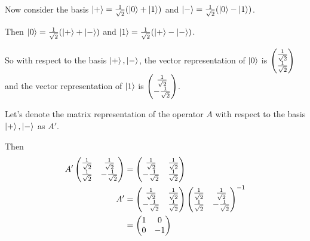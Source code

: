 \documentclass[12pt]{extarticle}
\begin{document}
\hhline

Now consider the basis $\ket{+} = \frac{1}{\sqrt{2}}(\ket{0} + \ket{1})$ and $\ket{-} = \frac{1}{\sqrt{2}}(\ket{0} - \ket{1})$.

Then $\ket{0} = \frac{1}{\sqrt{2}}(\ket{+} + \ket{-})$ and $\ket{1} = \frac{1}{\sqrt{2}}(\ket{+} - \ket{-})$.

So with respect to the basis $\ket{+}, \ket{-}$, the vector representation of $\ket{0}$ is
$\begin{pmatrix} \frac{1}{\sqrt{2}} \\ \frac{1}{\sqrt{2}} \end{pmatrix}$ and the vector representation of $\ket{1}$ is $\begin{pmatrix} \frac{1}{\sqrt{2}} \\ -\frac{1}{\sqrt{2}} \end{pmatrix}$.

Let's denote the matrix representation of the operator $A$ with respect to the basis $\ket{+}, \ket{-}$ as $A'$.

Then
\begin{align*}
A'\begin{pmatrix}\frac{1}{\sqrt{2}} & \frac{1}{\sqrt{2}} \\ \frac{1}{\sqrt{2}} & -\frac{1}{\sqrt{2}}\end{pmatrix} & = \begin{pmatrix} \frac{1}{\sqrt{2}} & \frac{1}{\sqrt{2}} \\ -\frac{1}{\sqrt{2}} & \frac{1}{\sqrt{2}} \end{pmatrix} \\
A' & = \begin{pmatrix} \frac{1}{\sqrt{2}} & \frac{1}{\sqrt{2}} \\ -\frac{1}{\sqrt{2}} & \frac{1}{\sqrt{2}}\end{pmatrix} {{\begin{pmatrix}\frac{1}{\sqrt{2}}& \frac{1}{\sqrt{2}}\\ \frac{1}{\sqrt{2}}& -\frac{1}{\sqrt{2}}\end{pmatrix}}^{-1}} \\
& = \begin{pmatrix} 1 & 0 \\ 0 & -1 \end{pmatrix}
\end{align*}

\end{document}
